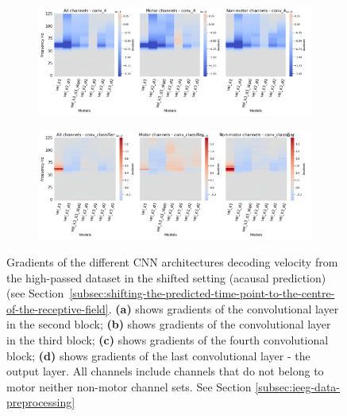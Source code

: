 \begin{figure}[!htbp]\ContinuedFloat
\begin{subfigure}[b]{\textwidth}
   \includegraphics[width=1\linewidth]{img/appendix/A/conv-4/hp-sm/vel-model_gradients_all_kinds}
   \caption{}
   \label{fig:vel-hp-shifted-grads-conv-4}
\end{subfigure}

\begin{subfigure}[b]{\textwidth}
   \includegraphics[width=1\linewidth]{img/appendix/A/conv-classifier/hp-sm/vel-model_gradients_all_kinds}
   \caption{}
   \label{fig:vel-hp-shifted-grads-conv-classifier}
\end{subfigure}

\caption[]{Gradients of the different CNN architectures decoding velocity from the high-passed dataset in the shifted setting (acausal prediction) (see Section~\ref{subsec:shifting-the-predicted-time-point-to-the-centre-of-the-receptive-field}. \textbf{(a)} shows gradients of the convolutional layer in the second block; \textbf{(b)} shows gradients of the convolutional layer in the third block; \textbf{(c)} shows gradients of the fourth convolutional block; \textbf{(d)} shows gradients of the last convolutional layer - the output layer. All channels include channels that do not belong to motor neither non-motor channel sets. See Section \ref{subsec:ieeg-data-preprocessing}}
\label{fig:vel-hp-shifted-grads}
\end{figure}

